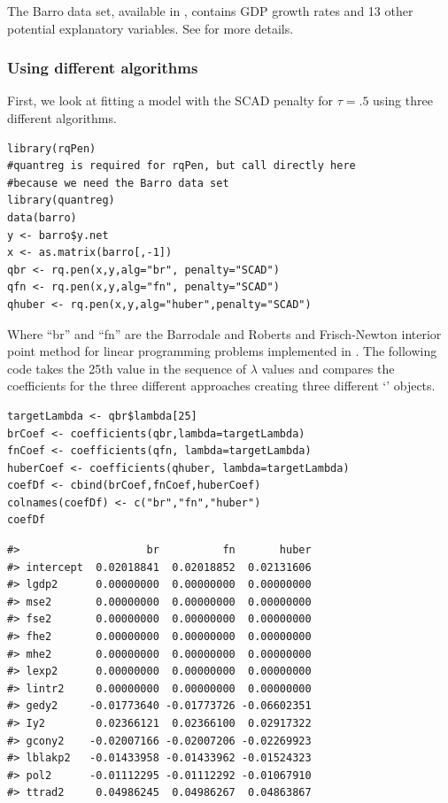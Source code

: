 The Barro data set, available in , contains GDP growth rates and 13 other potential explanatory variables. See \citet{barro} for more details.

\subsubsection{Using different algorithms}\label{using-different-algorithms}

First, we look at fitting a model with the SCAD penalty for \(\tau=.5\) using three different algorithms.

\begin{verbatim}
library(rqPen)
#quantreg is required for rqPen, but call directly here
#because we need the Barro data set
library(quantreg)
data(barro)
y <- barro$y.net
x <- as.matrix(barro[,-1])
qbr <- rq.pen(x,y,alg="br", penalty="SCAD")
qfn <- rq.pen(x,y,alg="fn", penalty="SCAD")
qhuber <- rq.pen(x,y,alg="huber",penalty="SCAD")
\end{verbatim}

Where ``br'' and ``fn'' are the Barrodale and Roberts \citep{crq1,crq2} and Frisch-Newton \citep{portnoy1997} interior point method for linear programming problems implemented in . The following code takes the 25th value in the sequence of \(\lambda\) values and compares the coefficients for the three different approaches creating three different `' objects.

\begin{verbatim}
targetLambda <- qbr$lambda[25]
brCoef <- coefficients(qbr,lambda=targetLambda)
fnCoef <- coefficients(qfn, lambda=targetLambda)
huberCoef <- coefficients(qhuber, lambda=targetLambda)
coefDf <- cbind(brCoef,fnCoef,huberCoef)
colnames(coefDf) <- c("br","fn","huber")
coefDf
\end{verbatim}

\begin{verbatim}
#>                    br          fn       huber
#> intercept  0.02018841  0.02018852  0.02131606
#> lgdp2      0.00000000  0.00000000  0.00000000
#> mse2       0.00000000  0.00000000  0.00000000
#> fse2       0.00000000  0.00000000  0.00000000
#> fhe2       0.00000000  0.00000000  0.00000000
#> mhe2       0.00000000  0.00000000  0.00000000
#> lexp2      0.00000000  0.00000000  0.00000000
#> lintr2     0.00000000  0.00000000  0.00000000
#> gedy2     -0.01773640 -0.01773726 -0.06602351
#> Iy2        0.02366121  0.02366100  0.02917322
#> gcony2    -0.02007166 -0.02007206 -0.02269923
#> lblakp2   -0.01433958 -0.01433962 -0.01524323
#> pol2      -0.01112295 -0.01112292 -0.01067910
#> ttrad2     0.04986245  0.04986267  0.04863867
\end{verbatim}


